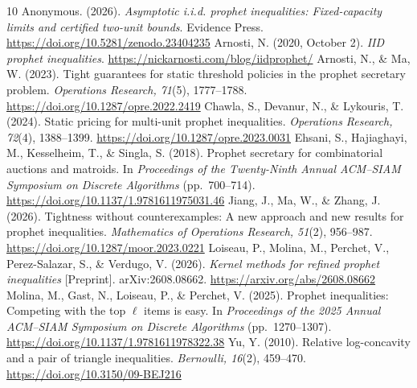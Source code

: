 \documentclass[11pt,a4paper]{article}
\theoremstyle{remark}
\begin{document}
\begin{thebibliography}{10}\small
{} Anonymous. (2026). \emph{Asymptotic i.i.d. prophet inequalities: Fixed-capacity limits and certified two-unit bounds}. Evidence Press. \url{https://doi.org/10.5281/zenodo.23404235}
 Arnosti, N. (2020, October 2). \emph{IID prophet inequalities}. \url{https://nickarnosti.com/blog/iidprophet/}
 Arnosti, N., \& Ma, W. (2023). Tight guarantees for static threshold policies in the prophet secretary problem. \emph{Operations Research, 71}(5), 1777--1788. \url{https://doi.org/10.1287/opre.2022.2419}
 Chawla, S., Devanur, N., \& Lykouris, T. (2024). Static pricing for multi-unit prophet inequalities. \emph{Operations Research, 72}(4), 1388--1399. \url{https://doi.org/10.1287/opre.2023.0031}
 Ehsani, S., Hajiaghayi, M., Kesselheim, T., \& Singla, S. (2018). Prophet secretary for combinatorial auctions and matroids. In \emph{Proceedings of the Twenty-Ninth Annual ACM--SIAM Symposium on Discrete Algorithms} (pp.~700--714). \url{https://doi.org/10.1137/1.9781611975031.46}
 Jiang, J., Ma, W., \& Zhang, J. (2026). Tightness without counterexamples: A new approach and new results for prophet inequalities. \emph{Mathematics of Operations Research, 51}(2), 956--987. \url{https://doi.org/10.1287/moor.2023.0221}
 Loiseau, P., Molina, M., Perchet, V., Perez-Salazar, S., \& Verdugo, V. (2026). \emph{Kernel methods for refined prophet inequalities} [Preprint]. arXiv:2608.08662. \url{https://arxiv.org/abs/2608.08662}
 Molina, M., Gast, N., Loiseau, P., \& Perchet, V. (2025). Prophet inequalities: Competing with the top $\ell$ items is easy. In \emph{Proceedings of the 2025 Annual ACM--SIAM Symposium on Discrete Algorithms} (pp.~1270--1307). \url{https://doi.org/10.1137/1.9781611978322.38}
 Yu, Y. (2010). Relative log-concavity and a pair of triangle inequalities. \emph{Bernoulli, 16}(2), 459--470. \url{https://doi.org/10.3150/09-BEJ216}
\end{thebibliography}
\end{document}
